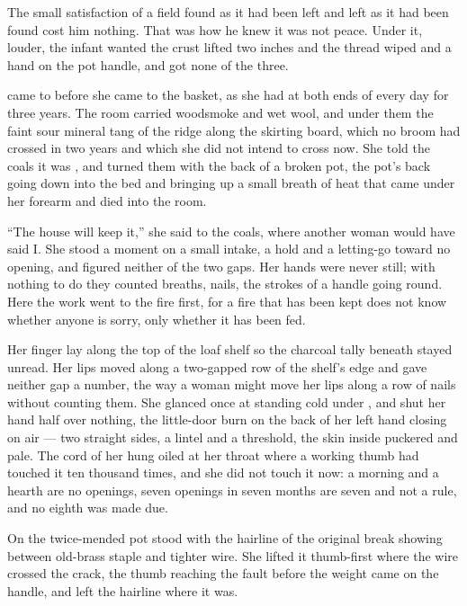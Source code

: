The small satisfaction of a field found as it had been left and left as it had been found cost him nothing. That was how he knew it was not peace. Under it, louder, the infant wanted the crust lifted two inches and the thread wiped and a hand on the pot handle, and got none of the three.

\scenebreak

 came to  before she came to the basket, as she had at both ends of every day for three years. The room carried woodsmoke and wet wool, and under them the faint sour mineral tang of the  ridge along the skirting board, which no broom had crossed in two years and which she did not intend to cross now. She told the coals it was , and turned them with the back of a broken pot, the pot's back going down into the bed and bringing up a small breath of heat that came under her forearm and died into the room.

“The house will keep it,” she said to the coals, where another woman would have said I. She stood a moment on a small intake, a hold and a letting-go toward no opening, and figured neither of the two gaps. Her hands were never still; with nothing to do they counted breaths, nails, the strokes of a handle going round. Here the work went to the fire first, for a fire that has been kept does not know whether anyone is sorry, only whether it has been fed.

Her finger lay along the top of the loaf shelf so the charcoal tally beneath stayed unread. Her lips moved along a two-gapped row of the shelf's edge and gave neither gap a number, the way a woman might move her lips along a row of nails without counting them. She glanced once at  standing cold under , and shut her hand half over nothing, the little-door burn on the back of her left hand closing on air --- two straight sides, a lintel and a threshold, the skin inside puckered and pale. The cord of her  hung oiled at her throat where a working thumb had touched it ten thousand times, and she did not touch it now: a morning and a hearth are no openings, seven openings in seven months are seven and not a rule, and no eighth was made due.

On  the twice-mended pot stood with the hairline of the original break showing between old-brass staple and tighter wire. She lifted it thumb-first where the wire crossed the crack, the thumb reaching the fault before the weight came on the handle, and left the hairline where it was.

